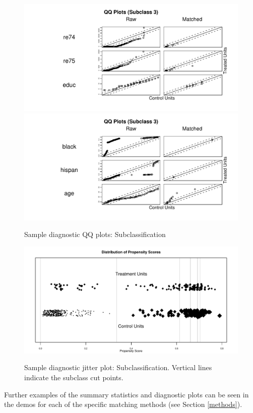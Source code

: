 \documentclass[oneside,letterpaper,titlepage]{article}
\begin{document}
\begin{figure}[tbp]
  \begin{center}
    {\includegraphics[scale=0.5]{figs/qqplotsub}}
    {\includegraphics[scale=0.5]{figs/qqplotsub2}}
    \hfill
    \caption{Sample diagnostic QQ plots: Subclassification}
\label{diagqqsub}
\end{center}
\end{figure}

\begin{figure}[tbp]
  \begin{center}
    {\includegraphics[scale=0.5]{figs/jitterplotsub}}
    \hfill
    \caption{Sample diagnostic jitter plot: Subclassification.  Vertical lines indicate the subclass cut points.}
\label{diagjittersub}
\end{center}
\end{figure}
Further examples of the summary statistics and diagnostic plots can be
seen in the demos for each of the specific matching methods (see
Section \ref{methods}).
\end{document}
